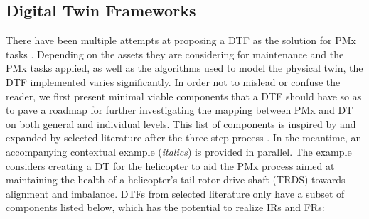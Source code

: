 \documentclass[runningheads]{llncs}
\begin{document}
\subsection{Digital Twin Frameworks} \label{sec:dtf}
There have been multiple attempts at proposing a DTF as the solution for PMx tasks \cite{onaji2022frame,sana2022frame}. Depending on the assets they are considering for maintenance and the PMx tasks applied, as well as the algorithms used to model the physical twin, the DTF implemented varies significantly. In order not to mislead or confuse the reader, we first present minimal viable components that a DTF should have so as to pave a roadmap for further investigating the mapping between PMx and DT on both general and individual levels. This list of components is inspired by \cite{kunzer2022digital} and expanded by selected literature after the three-step process \cite{ma2023twin}. In the meantime, an accompanying contextual example (\textit{italics}) is provided in parallel. The example considers creating a DT for the helicopter to aid the PMx process aimed at maintaining the health of a helicopter's tail rotor drive shaft (TRDS) towards alignment and imbalance. DTFs from selected literature only have a subset of components listed below, which has the potential to realize IRs and FRs:
\end{document}
